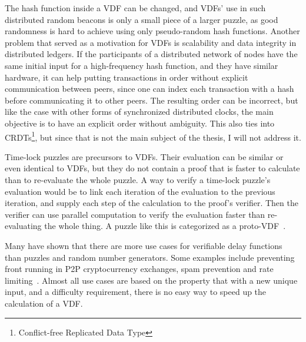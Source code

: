 The hash function inside a VDF can be changed, and VDFs' use in such distributed random beacons is only a small piece of a larger puzzle, as good randomness is hard to achieve using only pseudo-random hash functions. Another problem that served as a motivation for VDFs is scalability and data integrity in distributed ledgers. If the participants of a distributed network of nodes have the same initial input for a high-frequency hash function, and they have similar hardware, it can help putting transactions in order without explicit communication between peers, since one can index each transaction with a hash before communicating it to other peers. The resulting order can be incorrect, but like the case with other forms of synchronized distributed clocks, the main objective is to have an explicit order without ambiguity. This also ties into CRDTs\footnote{Conflict-free Replicated Data Type}, but since that is not the main subject of the thesis, I will not address it.

Time-lock puzzles are precursors to VDFs. Their evaluation can be similar or even identical to VDFs, but they do not contain a proof that is faster to calculate than to re-evaluate the whole puzzle. A way to verify a time-lock puzzle's evaluation would be to link each iteration of the evaluation to the previous iteration, and supply each step of the calculation to the proof's verifier. Then the verifier can use parallel computation to verify the evaluation faster than re-evaluating the whole thing. A puzzle like this is categorized as a proto-VDF~\cite{Boneh_undated-uz}.

Many have shown that there are more use cases for verifiable delay functions than puzzles and random number generators. Some examples include preventing front running in P2P cryptocurrency exchanges, spam prevention and rate limiting~\cite{noauthor_undated-hk}. Almost all use cases are based on the property that with a new unique input, and a difficulty requirement, there is no easy way to speed up the calculation of a VDF.

